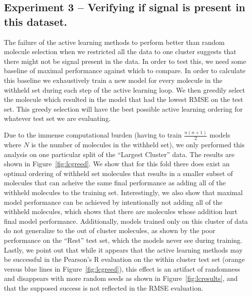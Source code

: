 \documentclass[journal=jmcmar,manuscript=article]{achemso}
\begin{document}
\subsection{Experiment 3 -- Verifying if signal is present in this dataset.}
The failure of the active learning methods to perform better than random molecule selection when we restricted all the data to one cluster suggests that there might not be signal present in the data. In order to test this, we need some baseline of maximal performance against which to compare. In order to calculate this baseline we exhaustively train a new model for every molecule in the withheld set during each step of the active learning loop. We then greedily select the molecule which resulted in the model that had the lowest RMSE on the test set. This greedy selection will have the best possible active learning ordering for whatever test set we are evaluating.

Due to the immense computational burden (having to train $\frac{n(n+1)}{2}$ models where $N$ is the number of molecules in the withheld set), we only performed this analysis on one particular split of the ``Largest Cluster'' data. The results are shown in Figure~\ref{fig:lcgreed}. We show that for this fold there does exist an optimal ordering of withheld set molecules that results in a smaller subset of molecules that can acheive the same final performance as adding all of the withheld molecules to the training set. Interestingly, we also show that maximal model performance can be achieved by intentionally not adding all of the withheld molecules, which shows that there are molecules whose addition hurt final model performance. Additionally, models trained only on this cluster of data do not generalize to the out of cluster molecules, as shown by the poor performance on the ``Rest'' test set, which the models never see during training. Lastly, we point out that while it appears that the active learning methods may be successful in the Pearson's R evaluation on the within cluster test set (orange versus blue lines in Figure~\ref{fig:lcgreed}), this effect is an artifact of randomness and disappears with more random seeds as shown in Figure~\ref{fig:lcresults}, and that the supposed success is not reflected in the RMSE evaluation.
\end{document}
